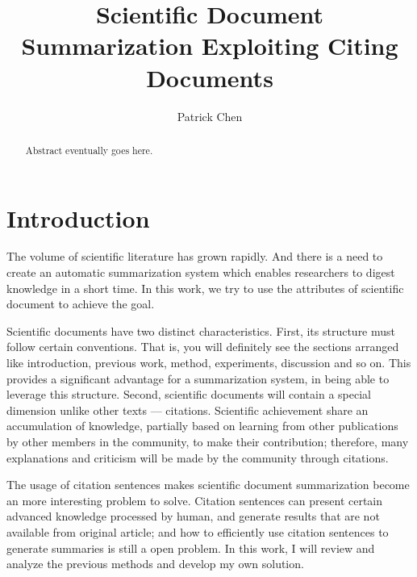 \documentclass[hyp]{socreport}
\begin{document}
\title{Scientific Document Summarization Exploiting Citing Documents}
\author{Patrick Chen}
\maketitle

\begin{abstract}
Abstract eventually goes here.
\end{abstract}

\section{Introduction}

  
The volume of scientific literature has grown rapidly. And there is a need to create an automatic 
summarization system which enables researchers to digest knowledge in a short time. In this work, 
we try to use the attributes of scientific document to achieve the goal.


  Scientific documents have two distinct characteristics. First, its structure must follow certain conventions. That is, you will definitely see the sections arranged like introduction, previous work, method, experiments, discussion and so on. This provides a significant advantage for a summarization system, in being able to leverage this structure. Second, scientific documents will contain a special dimension unlike other texts –-- citations. Scientific achievement share an accumulation of knowledge, partially based on learning from other publications by other members in the community, to make their contribution; therefore, many explanations and criticism will be made by the community through citations.  

The usage of citation sentences makes scientific document summarization become an more interesting problem to solve. Citation sentences can present certain advanced knowledge processed by human, and generate results that are not available from original article; and how to efficiently use citation sentences to generate summaries is still a open problem. In this work, I will review and analyze the previous methods and develop my own solution.
\end{document}
